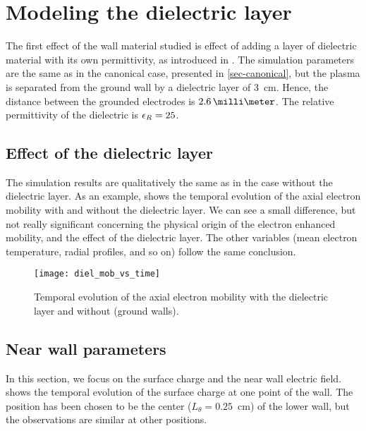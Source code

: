 
\section{Modeling the dielectric layer }
  \label{sec-diel_layer}
  
  The first effect of the wall material studied is effect of adding a layer of dielectric material with its own permittivity, as introduced in .
  The simulation parameters are the same as in the canonical case, presented in \cref{sec-canonical}, but the plasma is separated from the ground wall by a dielectric layer of 3~cm.
  Hence, the distance between the grounded electrodes is $2.6\,\milli\meter$.
  The relative permittivity of the dielectric is $\epsilon_{R}=25$.
  
  
  \subsection{Effect of the dielectric layer} \label{subsec-effect_mob}
  
  The simulation results are qualitatively the same as in the case without the dielectric layer.
  As an example,  shows the temporal evolution of the axial electron mobility with and without the dielectric layer.
  We can see a small difference, but not really significant concerning the physical origin of the electron enhanced mobility, and the effect of the dielectric layer.
  The other variables (mean electron temperature, radial profiles, and so on) follow the same conclusion.
  
  \begin{figure}[hbtp]
    \centering
    \texttt{[image: diel\_mob\_vs\_time]}
    \caption{Temporal evolution of the axial electron mobility with the dielectric layer and without (ground walls).}
    \label{fig-mod_diel_comp}
  \end{figure}
  
  \subsection{Near wall parameters} \label{subsec-nearwall}
    In this section, we focus on the surface charge and the near wall electric field.
     shows the temporal evolution of the surface charge at one point of the wall.
    The position has been chosen to be the center ($L_{\theta} = 0.25$~cm) of the lower wall, but the observations are similar at other positions.
     
